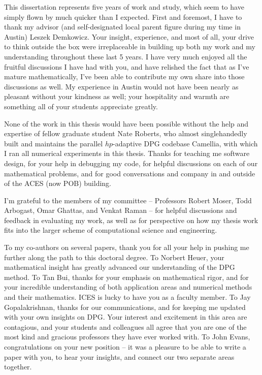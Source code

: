 
This dissertation represents five years of work and study, which seem to have simply flown by much quicker than I expected.  First and foremost, I have to thank my advisor (and self-designated local parent figure during my time in Austin) Leszek Demkowicz.  Your insight, experience, and most of all, your drive to think outside the box were irreplaceable in building up both my work and my understanding throughout these last 5 years.  I have very much enjoyed all the fruitful discussions I have had with you, and have relished the fact that as I've mature mathematically, I've been able to contribute my own share into those discussions as well.  My experience in Austin would not have been nearly as pleasant without your kindness as well; your hospitality and warmth are something all of your students appreciate greatly.  

None of the work in this thesis would have been possible without the help and expertise of fellow graduate student Nate Roberts, who almost singlehandedly built and maintains the parallel $hp$-adaptive DPG codebase Camellia, with which I ran all numerical experiments in this thesis.  Thanks for teaching me software design, for your help in debugging my code, for helpful discussions on each of our mathematical problems, and for good conversations and company in and outside of the ACES (now POB) building.  

I'm grateful to the members of my committee -- Professors Robert Moser, Todd Arbogast, Omar Ghattas, and Venkat Raman -- for helpful discussions and feedback in evaluating my work, as well as for perspective on how my thesis work fits into the larger scheme of computational science and engineering.  

To my co-authors on several papers, thank you for all your help in pushing me further along the path to this doctoral degree.  To Norbert Heuer, your mathematical insight has greatly advanced our understanding of the DPG method.  To Tan Bui, thanks for your emphasis on mathematical rigor, and for your incredible understanding of both application areas and numerical methods and their mathematics.  ICES is lucky to have you as a faculty member.  To Jay Gopalakrishnan, thanks for our communications, and for keeping me updated with your own insights on DPG.  Your interest and excitement in this area are contagious, and your students and colleagues all agree that you are one of the most kind and gracious professors they have ever worked with.  To John Evans, congratulations on your new position -- it was a pleasure to be able to write a paper with you, to hear your insights, and connect our two separate areas together.

